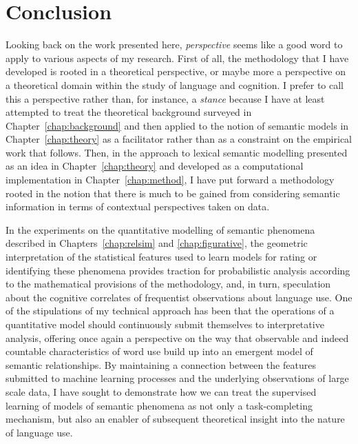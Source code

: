 \chapter{Conclusion}
Looking back on the work presented here, \emph{perspective} seems like a good word to apply to various aspects of my research.  First of all, the methodology that I have developed is rooted in a theoretical perspective, or maybe more a perspective on a theoretical domain within the study of language and cognition.  I prefer to call this a perspective rather than, for instance, a \emph{stance} because I have at least attempted to treat the theoretical background surveyed in Chapter~\ref{chap:background} and then applied to the notion of semantic models in Chapter~\ref{chap:theory} as a facilitator rather than as a constraint on the empirical work that follows.  Then, in the approach to lexical semantic modelling presented as an idea in Chapter~\ref{chap:theory} and developed as a computational implementation in Chapter~\ref{chap:method}, I have put forward a methodology rooted in the notion that there is much to be gained from considering semantic information in terms of contextual perspectives taken on data.

In the experiments on the quantitative modelling of semantic phenomena described in Chapters~\ref{chap:relsim} and \ref{chap:figurative}, the geometric interpretation of the statistical features used to learn models for rating or identifying these phenomena provides traction for probabilistic analysis according to the mathematical provisions of the methodology, and, in turn, speculation about the cognitive correlates of frequentist observations about language use.  One of the stipulations of my technical approach has been that the operations of a quantitative model should continuously submit themselves to interpretative analysis, offering once again a perspective on the way that observable and indeed countable characteristics of word use build up into an emergent model of semantic relationships.  By maintaining a connection between the features submitted to machine learning processes and the underlying observations of large scale data, I have sought to demonstrate how we can treat the supervised learning of models of semantic phenomena as not only a task-completing mechanism, but also an enabler of subsequent theoretical insight into the nature of language use.

